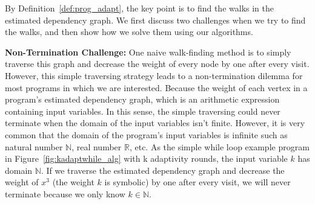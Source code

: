 By Definition~\ref{def:prog_adapt}, the key point is to find the walks in the estimated dependency graph. 
We first discuss two challenges when we try to find the walks,
and then show how we solve them using our algorithms.

\textbf{Non-Termination Challenge:}
One naive walk-finding method is to simply traverse this graph and decrease the weight of every node by one after every visit. However, this simple 
traversing strategy leads to a non-termination dilemma for most programs in which we are interested. 
Because the weight of each vertex in a program's estimated dependency graph,
which is an arithmetic expression containing input variables. 
In this sense, the simple traversing could never terminate when the domain of the input variables isn't finite.
However, it is very common that the domain of the program's input variables is infinite such as natural number $\mathbb{N}$, real number $\mathbb{R}$, etc. As the simple while loop example program in Figure~\ref{fig:kadaptwhile_alg} with k adaptivity rounds, the input variable $k$ has domain $\mathbb{N}$.
If we traverse the estimated dependency graph and decrease the weight of $x^3$ (the weight $k$ is symbolic) by one after every visit,
we will never terminate because we only know $k \in \mathbb{N}$.



